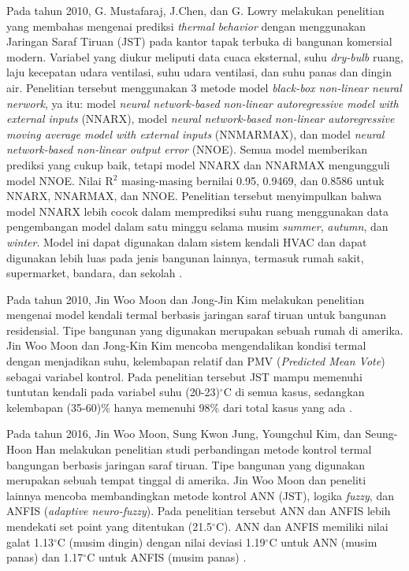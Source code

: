 Pada tahun 2010, G. Mustafaraj, J.Chen, dan G. Lowry melakukan penelitian yang membahas mengenai prediksi \textit{thermal behavior} dengan menggunakan Jaringan Saraf Tiruan (JST) pada kantor tapak terbuka di bangunan komersial modern. Variabel yang diukur meliputi data cuaca eksternal, suhu \textit{dry-bulb} ruang, laju kecepatan udara ventilasi, suhu udara ventilasi, dan suhu panas dan dingin air. Penelitian tersebut menggunakan 3 metode model \textit{black-box non-linear neural nerwork}, ya	itu: model \textit{neural network-based non-linear autoregressive model with external inputs} (NNARX), model \textit{ neural network-based non-linear autoregressive moving average model with external inputs} (NNMARMAX), dan model \textit{neural network-based non-linear output error} (NNOE). Semua model memberikan prediksi yang cukup baik, tetapi model NNARX dan NNARMAX mengungguli model NNOE. Nilai R$^2$ masing-masing bernilai 0.95, 0.9469, dan 0.8586 untuk NNARX, NNARMAX, dan NNOE. Penelitian tersebut menyimpulkan bahwa model NNARX lebih cocok dalam memprediksi suhu ruang menggunakan data pengembangan model dalam satu minggu selama musim \textit{summer}, \textit{autumn}, dan \textit{winter}. Model ini dapat digunakan dalam sistem kendali HVAC dan dapat digunakan lebih luas pada jenis bangunan lainnya, termasuk rumah sakit, supermarket, bandara, dan sekolah \cite{article11}.

Pada tahun 2010, Jin Woo Moon dan Jong-Jin Kim melakukan penelitian mengenai model kendali termal berbasis jaringan saraf tiruan untuk bangunan residensial. Tipe bangunan yang digunakan merupakan sebuah rumah di amerika. Jin Woo Moon dan Jong-Kin Kim mencoba mengendalikan kondisi termal dengan menjadikan suhu, kelembapan relatif dan PMV (\textit{Predicted Mean Vote}) sebagai variabel kontrol. Pada penelitian tersebut JST mampu memenuhi tuntutan kendali pada variabel suhu (20-23)$^\circ$C di semua kasus, sedangkan kelembapan (35-60)\% hanya memenuhi 98\% dari total kasus yang ada \cite{article12}.

Pada tahun 2016, Jin Woo Moon, Sung Kwon Jung, Youngchul Kim, dan Seung-Hoon Han melakukan penelitian studi perbandingan metode kontrol termal bangungan berbasis jaringan saraf tiruan. Tipe bangunan yang digunakan merupakan sebuah tempat tinggal di amerika. Jin Woo Moon dan peneliti lainnya mencoba membandingkan metode kontrol ANN (JST), logika \textit{fuzzy}, dan ANFIS (\textit{adaptive neuro-fuzzy}). Pada penelitian tersebut ANN dan ANFIS lebih mendekati set point yang ditentukan (21.5$^{\circ}$C). ANN dan ANFIS memiliki nilai galat 1.13$^{\circ}$C (musim dingin) dengan nilai deviasi 1.19$^{\circ}$C untuk ANN (musim panas) dan 1.17$^{\circ}$C untuk ANFIS (musim panas) \cite{article13}.

